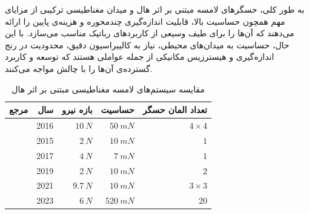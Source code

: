 به طور کلی، حسگرهای لامسه مبتنی بر اثر هال و میدان مغناطیسی ترکیبی از مزایای مهم همچون حساسیت بالا، قابلیت اندازه‌گیری چندمحوره و هزینه‌ی پایین را ارائه می‌دهند که آن‌ها را برای طیف وسیعی از کاربردهای رباتیک مناسب می‌سازد. با این حال، حساسیت به میدان‌های محیطی، نیاز به کالیبراسیون دقیق، محدودیت در رنج اندازه‌گیری و هیسترزیس مکانیکی از جمله عواملی هستند که توسعه و کاربرد گسترده‌ی آن‌ها را با چالش مواجه می‌کنند.
\begin{table}[t]
	\centering
	\caption{مقایسه سیستم‌های لامسه مغناطیسی مبتنی بر اثر هال}
	\label{tab:mag}
	\onehalfspacing
	\begin{tabular}{|r|r|r|r|r|}
		\hline
		\textbf{مرجع} & \textbf{سال}  & \textbf{بازه نیرو} & \textbf{حساسیت} & \textbf{تعداد المان حسگر} \\ \hline \hline
		\cite{wang2016three} 
		& 2016 
		& $10 \: N$
		& $50 \: mN$
		& $ 4 \times 4$\\
		\hline
		
\cite{jamone2015highly} 
& 2015
& $2 \: N$
& $10 \: mN$
&$1$\\
\hline

		\cite{paulino2017low} 
& 2017
& $4 \: N$
& $7 \: mN$
& $1$ \\
\hline
		
		\cite{rosle2019soft} 
		& 2019
		& $2 \: N$
		& $10 \: mN$
		&$2$\\
		\hline
		

		
		\cite{yan2021soft} 
		& 2021
		& $9.7 \: N$
		& $10 \: mN$
		&$3 \times 3$\\
		\hline
		
		\cite{sathe2023fingertac} 
		& 2023
		& $6 \: N$
		& $520 \: mN$
		& 20 \\
		\hline
	\end{tabular}
\end{table}

